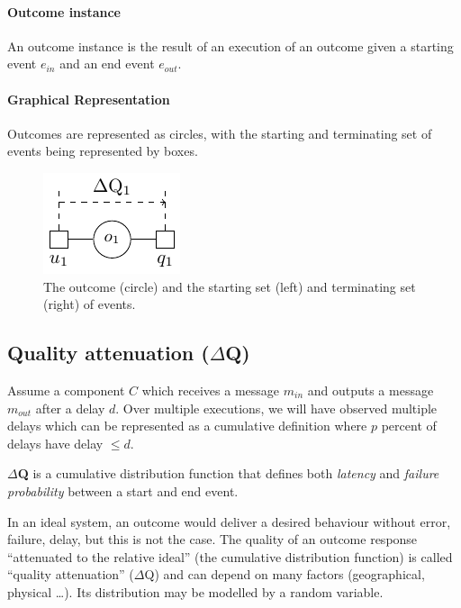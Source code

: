     \paragraph{Outcome instance}
    An outcome instance is the result of an execution of an outcome given a starting event $e_{in}$ and an end event $e_{out}$. \cite{art}

    \paragraph{Graphical Representation}
    Outcomes are represented as circles, with the starting and terminating set of events being represented by boxes.
    \begin{figure}[H]
        \begin{center}
            \includegraphics[scale=1.2]{tikz/outdq.pdf}
        \end{center}
        \caption{The outcome (circle) and the starting set (left) and terminating set (right) of events. \cite{myo}}
    \end{figure}

\subsection{Quality attenuation ($\Delta$Q)}
        Assume a component $C$ which receives a message $m_{in}$ and outputs a message $m_{out}$ after a delay $d$. Over multiple executions, we will have observed multiple delays which can be represented as a cumulative definition where $p$ percent of delays have delay $\le d$. \cite{art} 

        \textbf{$\Delta$Q} is a cumulative distribution function that defines both \textit{latency} and \textit{failure probability} between a start and end event. \cite{dq-tut}

        In an ideal system, an outcome would deliver a desired behaviour without error, failure, delay, but this is not the case. The quality of an outcome response ``attenuated to the relative ideal'' (the cumulative distribution function) is called ``quality attenuation'' ($\Delta$Q) and can depend on many factors (geographical, physical \dots). Its distribution may be modelled by a random variable.

